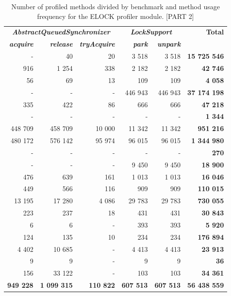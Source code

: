 \documentclass[]{usiinfthesis}
\begin{document}
 \begin{table}
\centering
\caption[Method Usage Frequencies for ELCOK pt.2]{Number of profiled methods divided by benchmark and method usage frequency for the ELOCK profiler module. [PART 2]}
\label{tab:7}
\begin{tabular}{|r|r|r|r|r|r|}
\hline
 \multicolumn{3}{|c|}{\textbf{\textit{AbstractQueuedSynchronizer}}} & \multicolumn{2}{c|}{\textbf{\textit{LockSupport}}} & \textbf{ 	 Total 	 } \\ 
 
 \textbf{\textit{ 	acquire	 }}&\textbf{\textit{ 	release	 }}&\textbf{\textit{ 	tryAcquire	 }}&\textbf{\textit{ 	park	 }}&\textbf{\textit{ 	unpark	 }} &\\\hline	
		 -   	 & 	 40 	 & 	 20 	 & 	 3 518 	 & 	 3 518 	 &\textbf{ 	 15 725 546 	 }\\ 	
		 916 	 & 	 1 254 	 & 	 338 	 & 	 2 182 	 & 	 2 182 	 &\textbf{ 	 42 746 	 }\\ 	
		 56 	 & 	 69 	 & 	 13 	 & 	 109 	 & 	 109 	 &\textbf{ 	 4 058 	 }\\ 	
		 -   	 & 	 -   	 & 	 -   	 & 	 446 943 	 & 	 446 943 	 &\textbf{ 	 37 174 198 	 }\\ 	
		 335 	 & 	 422 	 & 	 86 	 & 	 666 	 & 	 666 	 &\textbf{ 	 47 218 	 }\\ 	
		 -   	 & 	 -   	 & 	 -   	 & 	 -   	 & 	 -   	 &\textbf{ 	 1 344 	 }\\ 	
		 448 709 	 & 	 458 709 	 & 	 10 000 	 & 	 11 342 	 & 	 11 342 	 &\textbf{ 	 951 216 	 }\\ 	
		 480 172 	 & 	 576 142 	 & 	 95 974 	 & 	 96 015 	 & 	 96 015 	 &\textbf{ 	 1 344 980 	 }\\ 	
		 -   	 & 	 -   	 & 	 -   	 & 	 -   	 & 	 -   	 &\textbf{ 	 270 	 }\\ 	
		 -   	 & 	 -   	 & 	 -   	 & 	 9 450 	 & 	 9 450 	 &\textbf{ 	 18 900 	 }\\ 	
		 476 	 & 	 639 	 & 	 161 	 & 	 1 013 	 & 	 1 013 	 &\textbf{ 	 16 046 	 }\\ 	
		 449 	 & 	 566 	 & 	 116 	 & 	 909 	 & 	 909 	 &\textbf{ 	 110 015 	 }\\ 	
		 13 195 	 & 	 17 280 	 & 	 4 086 	 & 	 29 783 	 & 	 29 783 	 &\textbf{ 	 730 055 	 }\\ 	
		 223 	 & 	 237 	 & 	 18 	 & 	 431 	 & 	 431 	 &\textbf{ 	 30 843 	 }\\ 	
		 6 	 & 	 6 	 & 	 -   	 & 	 393 	 & 	 393 	 &\textbf{ 	 5 920 	 }\\ 	
		 124 	 & 	 135 	 & 	 10 	 & 	 234 	 & 	 234 	 &\textbf{ 	 176 894 	 }\\ 	
		 4 402 	 & 	 10 685 	 & 	 -   	 & 	 4 413 	 & 	 4 413 	 &\textbf{ 	 23 913 	 }\\ 	
		 9 	 & 	 9 	 & 	 -   	 & 	 9 	 & 	 9 	 &\textbf{ 	 36 	 }\\ 	
		 156 	 & 	 33 122 	 & 	 -   	 & 	 103 	 & 	 103 	 &\textbf{ 	 34 361 	 }\\ 	 \hline 
 \textbf{ 		 949 228 	 }&\textbf{ 	 1 099 315 	 }&\textbf{ 	 110 822 	 }&\textbf{ 	 607 513 	 }&\textbf{ 	 607 513 	 }&\textbf{ 	 56 438 559 	 }\\ 	



\end{tabular}
\end{table}
\end{document}
